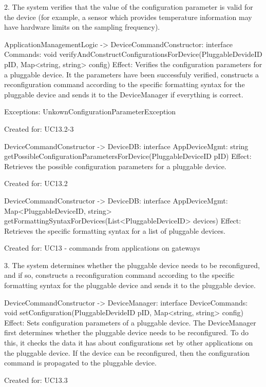             2. The system verifies that the value of the configuration parameter is valid for the device (for example, a sensor which provides temperature information may have hardware limits on the sampling frequency).

                    ApplicationManagementLogic -> DeviceCommandConstructor: interface Commands: void verifyAndConstructConfigurationsForDevice(PluggableDevideID pID, Map<string, string> config)
                        Effect: Verifies the configuration parameters for a pluggable device. It the parameters have been successfuly verified,
                                constructs a reconfiguration command according to the specific formatting syntax for the pluggable device and sends it to the DeviceManager if everything is correct.
                        \item Exceptions: UnkownConfigurationParameterException
                        \item Created for: UC13.2-3

                    DeviceCommandConstructor -> DeviceDB: interface AppDeviceMgmt: string getPossibleConfigurationParametersForDevice(PluggableDeviceID pID)
                        Effect: Retrieves the possible configuration parameters for a pluggable device.
                        \item Created for: UC13.2

                    DeviceCommandConstructor -> DeviceDB: interface AppDeviceMgmt: Map<PluggableDeviceID, string> getFormattingSyntaxForDevices(List<PluggableDeviceID> devices)
                        Effect: Retrieves the specific formatting syntax for a list of pluggable devices.
                        \item Created for: UC13 - commands from applications on gateways


            3. The system determines whether the pluggable device needs to be reconfigured, and if so,
               constructs a reconfiguration command according to the specific formatting syntax for the pluggable device and sends it to the pluggable device.

                    DeviceCommandConstructor -> DeviceManager: interface DeviceCommands: void setConfiguration(PluggableDevideID pID, Map<string, string> config)
                        Effect: Sets configuration parameters of a pluggable device. The DeviceManager first determines whether the pluggable device needs to be reconfigured. To do this,
                                it checks the data it has about configurations set by other applications on the pluggable device. If the device can be reconfigured, then the configuration
                                command is propagated to the pluggable device.
                        \item Created for: UC13.3

